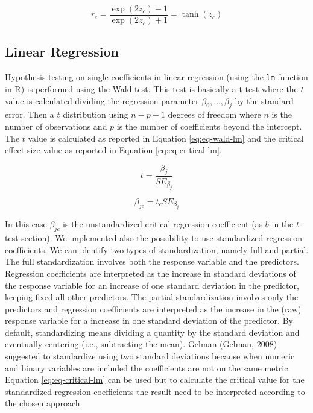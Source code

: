 \documentclass[
  man]{apa7}
\begin{document}
\begin{equation}
    \label{eq:eq-bk-r}
    r_c = \frac{\exp(2z_c)-1}{\exp(2z_c)+1} = \operatorname{tanh}(z_c)
\end{equation}

\subsection{Linear Regression}\label{linear-regression}

Hypothesis testing on single coefficients in linear regression (using the \texttt{lm} function in R) is performed using the Wald test. This test is basically a t-test where the \(t\) value is calculated dividing the regression parameter \(\beta_0, \dots, \beta_j\) by the standard error. Then a \(t\) distribution using \(n - p - 1\) degrees of freedom where \(n\) is the number of observations and \(p\) is the number of coefficients beyond the intercept. The \(t\) value is calculated as reported in Equation \eqref{eq:eq-wald-lm} and the critical effect size value as reported in Equation \eqref{eq:eq-critical-lm}.

\begin{equation}
\label{eq:eq-wald-lm}
    t = \frac{\beta_j}{SE_{\beta_j}}
\end{equation}

\begin{equation}
\label{eq:eq-critical-lm}
    \beta_{jc} = t_c SE_{\beta_j}
\end{equation}

In this case \(\beta_{jc}\) is the unstandardized critical regression coefficient (as \(b\) in the \(t\)-test section). We implemented also the possibility to use standardized regression coefficients. We can identify two types of standardization, namely full and partial. The full standardization involves both the response variable and the predictors. Regression coefficients are interpreted as the increase in standard deviations of the response variable for an increase of one standard deviation in the predictor, keeping fixed all other predictors. The partial standardization involves only the predictors and regression coefficients are interpreted as the increase in the (raw) response variable for a increase in one standard deviation of the predictor. By default, standardizing means dividing a quantity by the standard deviation and eventually centering (i.e., subtracting the mean). Gelman (Gelman, 2008) suggested to standardize using two standard deviations because when numeric and binary variables are included the coefficients are not on the same metric. Equation \eqref{eq:eq-critical-lm} can be used but to calculate the critical value for the standardized regression coefficients the result need to be interpreted according to the chosen approach.
\end{document}

